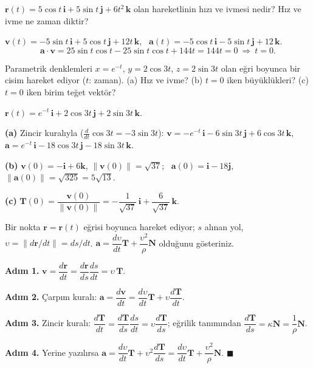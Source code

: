 \begin{soru}
$\mathbf r(t)=5\cos t\,\mathbf i+5\sin t\,\mathbf j+6t^2\,\mathbf k$ olan hareketlinin hızı ve ivmesi nedir? Hız ve ivme ne zaman diktir?
\end{soru}
\begin{cevap}
$\mathbf v(t)=-5\sin t\,\mathbf i+5\cos t\,\mathbf j+12t\,\mathbf k$, \ $\mathbf a(t)=-5\cos t\,\mathbf i-5\sin t\,\mathbf j+12\,\mathbf k$.
\[ \mathbf a\cdot\mathbf v=25\sin t\cos t-25\sin t\cos t+144t=144t=0\ \Rightarrow\ t=0 . \]
\end{cevap}

\begin{soru}
Parametrik denklemleri $x=e^{-t}$, $y=2\cos3t$, $z=2\sin3t$ olan eğri boyunca bir cisim hareket ediyor ($t$: zaman).
(a) Hız ve ivme? (b) $t=0$ iken büyüklükleri? (c) $t=0$ iken birim teğet vektör?
\end{soru}
\begin{cevap}
$\mathbf r(t)=e^{-t}\,\mathbf i+2\cos3t\,\mathbf j+2\sin3t\,\mathbf k$.

\textbf{(a)} Zincir kuralıyla ($\frac{d}{dt}\cos3t=-3\sin3t$):
$\mathbf v=-e^{-t}\,\mathbf i-6\sin3t\,\mathbf j+6\cos3t\,\mathbf k$, \ $\mathbf a=e^{-t}\,\mathbf i-18\cos3t\,\mathbf j-18\sin3t\,\mathbf k$.

\textbf{(b)} $\mathbf v(0)=-\mathbf i+6\mathbf k$, $\|\mathbf v(0)\|=\sqrt{37}$; \ $\mathbf a(0)=\mathbf i-18\mathbf j$, $\|\mathbf a(0)\|=\sqrt{325}=5\sqrt{13}$.

\textbf{(c)} $\mathbf T(0)=\dfrac{\mathbf v(0)}{\|\mathbf v(0)\|}=-\dfrac{1}{\sqrt{37}}\,\mathbf i+\dfrac{6}{\sqrt{37}}\,\mathbf k$.
\end{cevap}

\begin{soru}
Bir nokta $\mathbf r=\mathbf r(t)$ eğrisi boyunca hareket ediyor; $s$ alınan yol, $\upsilon=\|d\mathbf r/dt\|=ds/dt$.
$\mathbf a=\dfrac{d\upsilon}{dt}\mathbf T+\dfrac{\upsilon^2}{\rho}\mathbf N$ olduğunu gösteriniz.
\end{soru}
\begin{cevap}
\textbf{Adım 1.} $\mathbf v=\dfrac{d\mathbf r}{dt}=\dfrac{d\mathbf r}{ds}\dfrac{ds}{dt}=\upsilon\,\mathbf T$.

\textbf{Adım 2.} Çarpım kuralı: $\mathbf a=\dfrac{d\mathbf v}{dt}=\dfrac{d\upsilon}{dt}\mathbf T+\upsilon\dfrac{d\mathbf T}{dt}$.

\textbf{Adım 3.} Zincir kuralı: $\dfrac{d\mathbf T}{dt}=\dfrac{d\mathbf T}{ds}\dfrac{ds}{dt}=\upsilon\dfrac{d\mathbf T}{ds}$; eğrilik tanımından $\dfrac{d\mathbf T}{ds}=\kappa\mathbf N=\dfrac1\rho\mathbf N$.

\textbf{Adım 4.} Yerine yazılırsa $\mathbf a=\dfrac{d\upsilon}{dt}\mathbf T+\upsilon^2\dfrac{d\mathbf T}{ds}=\dfrac{d\upsilon}{dt}\mathbf T+\dfrac{\upsilon^2}{\rho}\mathbf N$. \hfill$\blacksquare$
\end{cevap}

